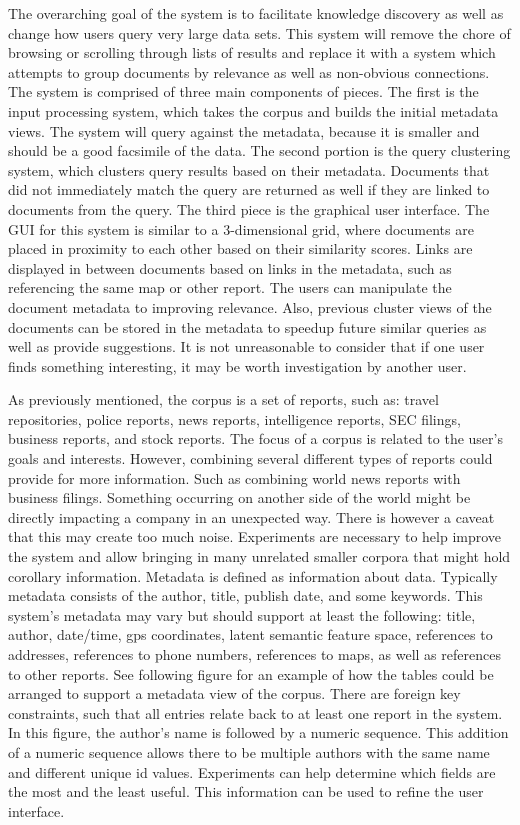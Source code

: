\documentclass[11pt]{article}
\begin{document}
The overarching goal of the system is to facilitate knowledge discovery as well as change how users query very large data sets.
This system will remove the chore of browsing or scrolling through lists of results and replace it with a system which attempts to group documents by relevance as well as non-obvious connections.
The system is comprised of three main components of pieces.
The first is the input processing system, which takes the corpus and builds the initial metadata views.
The system will query against the metadata, because it is smaller and should be a good facsimile of the data.
The second portion is the query clustering system, which clusters query results based on their metadata.
Documents that did not immediately match the query are returned as well if they are linked to documents from the query.
The third piece is the graphical user interface.
The GUI for this system is similar to a 3-dimensional grid, where documents are placed in proximity to each other based on their similarity scores.
Links are displayed in between documents based on links in the metadata, such as referencing the same map or other report.
The users can manipulate the document metadata to improving relevance.
Also, previous cluster views of the documents can be stored in the metadata to speedup future similar queries as well as provide suggestions.
It is not unreasonable to consider that if one user finds something interesting, it may be worth investigation by another user.

As previously mentioned, the corpus is a set of reports, such as: travel repositories, police reports, news reports, intelligence reports, SEC filings, business reports, and stock reports.
The focus of a corpus is related to the user's goals and interests.
However, combining several different types of reports could provide for more information.
Such as combining world news reports with business filings.
Something occurring on another side of the world might be directly impacting a company in an unexpected way.
There is however a caveat that this may create too much noise.
Experiments are necessary to help improve the system and allow bringing in many unrelated smaller corpora that might hold corollary information.
Metadata is defined as information about data.
Typically metadata consists of the author, title, publish date, and some keywords.
This system's metadata may vary but should support at least the following: title, author, date/time, gps coordinates, latent semantic feature space, references to addresses, references to phone numbers, references to maps, as well as references to other reports.
See following figure for an example of how the tables could be arranged to support a metadata view of the corpus.
There are foreign key constraints, such that all entries relate back to at least one report in the system.
In this figure, the author's name is followed by a numeric sequence.
This addition of a numeric sequence allows there to be multiple authors with the same name and different unique id values.
Experiments can help determine which fields are the most and the least useful.
This information can be used to refine the user interface.
\end{document}
